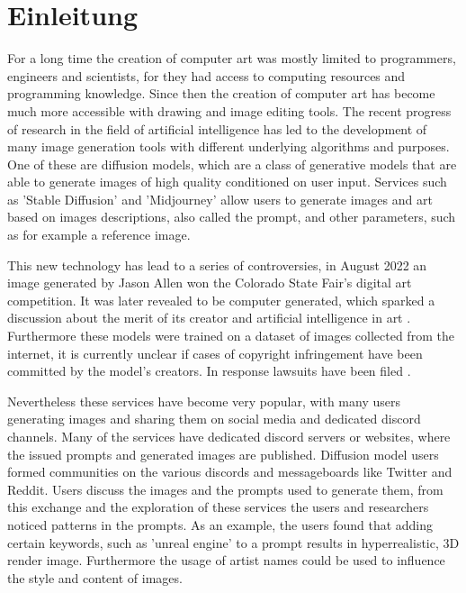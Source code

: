 \chapter{Einleitung}
\label{cha:Introduction}

For a long time the creation of computer art was mostly limited to programmers, engineers and scientists, for they had access to computing resources and programming knowledge. Since then the creation of computer art has become much more accessible with drawing and image editing tools. The recent progress of research in the field of artificial intelligence has led to the development of many image generation tools with different underlying algorithms and purposes. One of these are diffusion models, which are a class of generative models that are able to generate images of high quality conditioned on user input. Services such as 'Stable Diffusion' and 'Midjourney' allow users to generate images and art based on images descriptions, also called the prompt, and other parameters, such as for example a reference image.

This new technology has lead to a series of controversies, in August 2022 an image generated by Jason Allen won the Colorado State Fair's digital art competition. It was later revealed to be computer generated, which sparked a discussion about the merit of its creator and artificial intelligence in art \autocite{colorado}. Furthermore these models were trained on a dataset of images collected from the internet, it is currently unclear if cases of copyright infringement have been committed by the model's creators. In response lawsuits have been filed \autocite{getty}.

Nevertheless these services have become very popular, with many users generating images and sharing them on social media and dedicated discord channels. Many of the services have dedicated discord servers or websites, where the issued prompts and generated images are published. Diffusion model users formed communities on the various discords and messageboards like Twitter and Reddit. Users discuss the images and the prompts used to generate them, from this exchange and the exploration of these services the users and researchers \autocite{design-guidelines} noticed patterns in the prompts. As an example, the users found that adding certain keywords, such as 'unreal engine' to a prompt results in hyperrealistic, 3D render image. Furthermore the usage of artist names could be used to influence the style and content of images.


